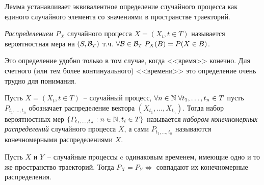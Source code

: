 \begin{remark}
Лемма устанавливает эквивалентное определение случайного процесса как единого случайного
элемента со значениями в пространстве траекторий.
\end{remark}

\begin{definition}
\emph{Распределением} $P_X$ случайного процесса $X =  (X_t, t \in T)$
называется вероятностная мера на $(S, \mathcal{B}_T)$
т.ч. $\forall \mathcal{B} \in \mathcal{B}_T \; P_X(B) =  P(X \in B)$.
\end{definition}

Это определение удобно только в том случае, когда <<время>> конечно.
Для счетного (или тем более континуального) <<времени>> это определение
очень трудно для понимания.

\begin{definition}
Пусть $X = (X_t, t \in T)$~--  случайный процесс, $\forall n \in \mathbb{N} \;
\forall t_1, \dots, t_n \in T$
пусть $P_{t_1, \dots, t_n}$ обозначает распределение вектора $(X_{t_1}, \dots, X_{t_n})$.
Тогда набор вероятностных мер $\{P_{t_1, \dots, t_n}: n \in \mathbb{N}, t_i \in T\}$
называется \emph{набором конечномерных распределений} случайного процесса $X$, а сами
$P_{t_1, \dots, t_n}$ называются конечномерными распределениями $X$.
\end{definition}


\begin{lem}
Пусть $X$ и $Y$~-- случайные процессы c одинаковым временем, имеющие одно и то же пространство
траекторий. Тогда $P_X = P_Y \Leftrightarrow$ совпадают их конечномерные распределения.
\end{lem}


